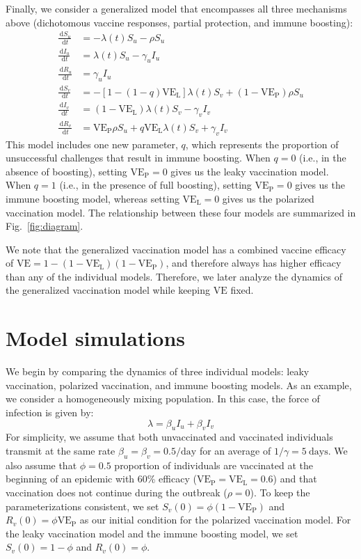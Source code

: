 \documentclass[12pt]{article}
\newcommand{\fref}[1]{Fig.~\ref{fig:#1}}
\newcommand{\dd}[1]{\ensuremath{\, \mathrm{d}#1}}
\newcommand{\VE}{\ensuremath{\mathrm{VE}}}
\newcommand{\VEP}{\ensuremath{\VE_{\mathrm{P}}}}
\newcommand{\VEL}{\ensuremath{\VE_{\mathrm{L}}}}
\begin{document}
Finally, we consider a generalized model that encompasses all three mechanisms above (dichotomous vaccine responses, partial protection, and immune boosting):
\begin{align}
\frac{\dd S_u}{\dd t} &= - \lambda(t) S_u - \rho S_u \\
\frac{\dd I_u}{\dd t} &= \lambda(t) S_u - \gamma_u I_u \\
\frac{\dd R_u}{\dd t} &= \gamma_u I_u \\
\frac{\dd S_v}{\dd t} &= - [1- (1-q) \VEL] \lambda(t) S_v + (1-\VEP) \rho S_u \\
\frac{\dd I_v}{\dd t} &= (1-\VEL) \lambda(t) S_v - \gamma_v I_v \\
\frac{\dd R_v}{\dd t} &= \VEP \rho S_u + q \VEL \lambda(t) S_v + \gamma_v I_v
\end{align}
This model includes one new parameter, $q$, which represents the proportion of unsuccessful challenges that result in immune boosting.
When $q=0$ (i.e., in the absence of boosting), setting $\VEP = 0$ gives us the leaky vaccination model. 
When $q=1$ (i.e., in the presence of full boosting), setting $\VEP = 0$ gives us the immune boosting model, whereas setting $\VEL = 0$ gives us the polarized vaccination model. 
The relationship between these four models are summarized in \fref{diagram}.

We note that the generalized vaccination model has a combined vaccine efficacy of $\VE = 1- (1-\VEL) (1-\VEP)$, and therefore always has higher efficacy than any of the individual models.
Therefore, we later analyze the dynamics of the generalized vaccination model while keeping $\VE$ fixed.

\section*{Model simulations}

We begin by comparing the dynamics of three individual models: leaky vaccination, polarized vaccination, and immune boosting models.
As an example, we consider a homogeneously mixing population. In this case, the force of infection is given by:
\begin{equation}
\lambda = \beta_u I_u + \beta_v I_v
\end{equation}
For simplicity, we assume that both unvaccinated and vaccinated individuals transmit at the same rate $\beta_u = \beta_v =0.5/\mathrm{day}$ for an average of $1/\gamma=5~\mathrm{days}$.
We also assume that $\phi = 0.5$ proportion of individuals are vaccinated at the beginning of an epidemic with 60\% efficacy ($\VEP=\VEL=0.6$) and that vaccination does not continue during the outbreak ($\rho = 0$).
To keep the parameterizations consistent, we set $S_v(0) = \phi (1-\VEP)$ and $R_v(0) = \phi \VEP$ as our initial condition for the polarized vaccination model.
For the leaky vaccination model and the immune boosting model, we set $S_v(0) = 1-\phi$ and $R_v(0) = \phi$.
\end{document}
